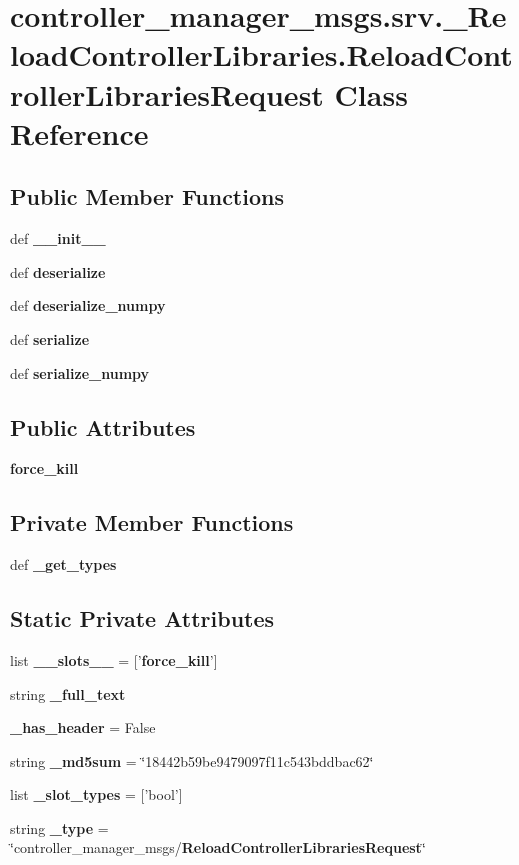 \section{controller\-\_\-manager\-\_\-msgs.\-srv.\-\_\-\-Reload\-Controller\-Libraries.\-Reload\-Controller\-Libraries\-Request \-Class \-Reference}
\label{classcontroller__manager__msgs_1_1srv_1_1__ReloadControllerLibraries_1_1ReloadControllerLibrariesRequest}
\subsection*{\-Public \-Member \-Functions}
\begin{DoxyCompactItemize}
\item 
def {\bf \-\_\-\-\_\-init\-\_\-\-\_\-}
\item 
def {\bf deserialize}
\item 
def {\bf deserialize\-\_\-numpy}
\item 
def {\bf serialize}
\item 
def {\bf serialize\-\_\-numpy}
\end{DoxyCompactItemize}
\subsection*{\-Public \-Attributes}
\begin{DoxyCompactItemize}
\item 
{\bf force\-\_\-kill}
\end{DoxyCompactItemize}
\subsection*{\-Private \-Member \-Functions}
\begin{DoxyCompactItemize}
\item 
def {\bf \-\_\-get\-\_\-types}
\end{DoxyCompactItemize}
\subsection*{\-Static \-Private \-Attributes}
\begin{DoxyCompactItemize}
\item 
list {\bf \-\_\-\-\_\-slots\-\_\-\-\_\-} = ['{\bf force\-\_\-kill}']
\item 
string {\bf \-\_\-full\-\_\-text}
\item 
{\bf \-\_\-has\-\_\-header} = \-False
\item 
string {\bf \-\_\-md5sum} = \char`\"{}18442b59be9479097f11c543bddbac62\char`\"{}
\item 
list {\bf \-\_\-slot\-\_\-types} = ['bool']
\item 
string {\bf \-\_\-type} = \char`\"{}controller\-\_\-manager\-\_\-msgs/{\bf \-Reload\-Controller\-Libraries\-Request}\char`\"{}
\end{DoxyCompactItemize}


